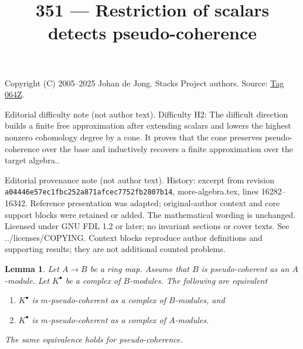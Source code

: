 \documentclass{amsart}
\theoremstyle{plain}
\newtheorem{lemma}[subsection]{Lemma}
\theoremstyle{definition}
\theoremstyle{remark}
\numberwithin{equation}{subsection}
\begin{document}
\title[Stacks Project, Tag 064Z]{351 --- Restriction of scalars detects pseudo-coherence}
\maketitle
\noindent Copyright (C) 2005--2025 Johan de Jong. Stacks Project authors. Source: \href{https://stacks.math.columbia.edu/tag/064Z}{Tag 064Z}.

\noindent Editorial difficulty note (not author text). Difficulty H2: The difficult direction builds a finite free approximation after extending scalars and lowers the highest nonzero cohomology degree by a cone. It proves that the cone preserves pseudo-coherence over the base and inductively recovers a finite approximation over the target algebra..

\noindent Editorial provenance note (not author text). History: excerpt from revision \texttt{a0444\allowbreak 6e57e\allowbreak c1fbc\allowbreak 252a8\allowbreak 71afc\allowbreak ec775\allowbreak 2fb28\allowbreak 07b14}, more-algebra.tex, lines 16282--16342. Reference presentation was adapted; original-author context and core support blocks were retained or added. The mathematical wording is unchanged. Licensed under GNU FDL 1.2 or later; no invariant sections or cover texts. See ../licenses/COPYING. Context blocks reproduce author definitions and supporting results; they are not additional counted problems.

\begin{lemma}
\label{lemma-finite-push-pseudo-coherent}
Let $A \to B$ be a ring map. Assume that $B$ is pseudo-coherent as an
$A$-module. Let $K^\bullet$ be a complex of $B$-modules.
The following are equivalent
\begin{enumerate}
\item $K^\bullet$ is $m$-pseudo-coherent
as a complex of $B$-modules, and
\item $K^\bullet$ is $m$-pseudo-coherent
as a complex of $A$-modules.
\end{enumerate}
The same equivalence holds for pseudo-coherence.
\end{lemma}
\end{document}
